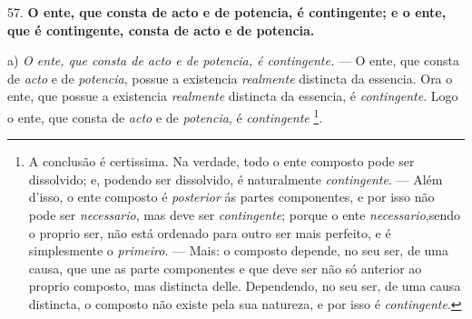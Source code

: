 57. \textbf{O ente, que consta de acto e de potencia, é contingente; e o ente, que é contingente, consta de acto e de potencia.}

a) \emph{O ente, que consta de acto e de potencia, é contingente.} --- O ente, que consta de \emph{acto} e de \emph{potencia}, possue a existencia \emph{realmente} distincta da essencia. Ora o ente, que possue a existencia \emph{realmente} distincta da essencia, é \emph{contingente}. Logo o ente, que consta de \emph{acto} e de \emph{potencia}, é \emph{contingente} \footnote{A conclusão é certissima. Na verdade, todo o ente composto pode ser dissolvido; e, podendo ser dissolvido, é naturalmente \emph{contingente}. --- Além d'isso, o ente composto é \emph{posterior} ás partes componentes, e por isso não pode ser \emph{necessario}, mas deve ser \emph{contingente}; porque o ente \emph{necessario},sendo o proprio ser, não está ordenado para outro ser mais perfeito, e é simplesmente o \emph{primeiro}. --- Mais: o composto depende, no seu ser, de uma causa, que une as parte componentes e que deve ser não só anterior ao proprio composto, mas distincta delle. Dependendo, no seu ser, de uma causa distincta, o composto não existe pela sua natureza, e por isso é \emph{contingente}.}.